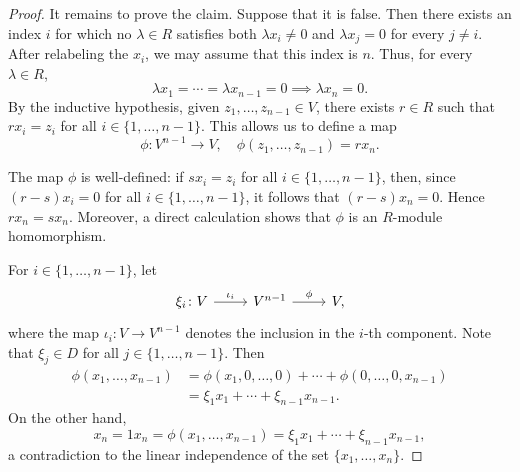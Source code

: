 \begin{proof}

    It remains to prove the claim. Suppose that it is false.
    Then there exists an index $i$ for which no $\lambda\in R$
    satisfies both $\lambda x_i\ne0$ and $\lambda x_j=0$ for
    every $j\ne i$. After relabeling the $x_i$, we may assume
    that this index is $n$. Thus, for every $\lambda\in R$,
    \[
        \lambda x_1=\cdots=\lambda x_{n-1}=0
        \implies 
        \lambda x_n=0.
    \]
    By the inductive hypothesis, given $z_1,\dots,z_{n-1}\in V$, 
    there exists $r\in R$ such that
    $rx_i=z_i$ for all $i\in\{1,\dots,n-1\}$. This allows us to define a map  
    \[
    \phi\colon V^{n-1}\to V,\quad \phi(z_1,\dots,z_{n-1})=rx_n.
    \]
    
    The map $\phi$ is well-defined: if $sx_i=z_i$ for all $i\in\{1,\dots,n-1\}$, then, since 
    $(r-s)x_i=0$ for all $i\in\{1,\dots,n-1\}$, it follows that
    $(r-s)x_n=0$. Hence $rx_n=sx_n$. Moreover, a direct calculation shows
    that $\phi$ is an $R$-module homomorphism. 

    For $i\in\{1,\dots,n-1\}$, let 
\[\begin{tikzcd}
	\xi_i\colon V & {V^{n-1}} & V,
	\arrow["{\iota_i}", from=1-1, to=1-2]
	\arrow["\phi", from=1-2, to=1-3]
\end{tikzcd}\]
    where the map $\iota_i\colon V\to V^{n-1}$ denotes the inclusion in the $i$-th component. Note that 
    $\xi_j\in D$ for all $j\in\{1,\dots,n-1\}$. 
    Then 
    \begin{align*}
        \phi(x_1,\dots,x_{n-1}) &= \phi(x_1,0,\dots,0)+\cdots+\phi(0,\dots,0,x_{n-1})\\
        &=\xi_1x_1+\cdots+\xi_{n-1}x_{n-1}.
    \end{align*}
    On the other hand, 
     \[
     x_n=1x_n=\phi(x_1,\dots,x_{n-1})=\xi_1x_1+\cdots+\xi_{n-1}x_{n-1},
     \]
    a contradiction to the linear independence of the set $\{x_1,\dots,x_{n}\}$. 
\end{proof}

